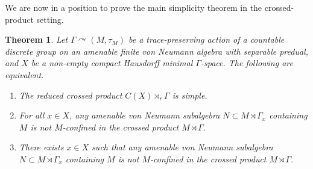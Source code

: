 \documentclass[12pt]{amsart} %
\theoremstyle{plain}
\newtheorem{theorem}{Theorem}[section]
\theoremstyle{definition}
\begin{document}
\noindent We are now in a position to prove the main simplicity theorem in the crossed-product setting.
\begin{theorem}\label{ThmUnified}
Let $\Gamma \curvearrowright (M,\tau_M)$ be a trace-preserving action of a countable discrete group on an
amenable finite von Neumann algebra with separable predual, and  $X$ be a non-empty compact Hausdorff minimal $\Gamma$-space. The following are equivalent.
\begin{enumerate}
\item The reduced crossed product $C(X) \rtimes_r \Gamma$ is simple.
\item For all $x \in X$, any amenable von Neumann subalgebra $N\subset M\rtimes\Gamma_x$ containing $M$ is not $M$-confined in the crossed product $M\rtimes\Gamma$.
\item There exists $x \in X$ such that any amenable von Neumann subalgebra $N\subset M\rtimes\Gamma_x$ containing $M$ is not $M$-confined in the crossed product $M\rtimes\Gamma$.
\end{enumerate}
\end{theorem}
\end{document}
